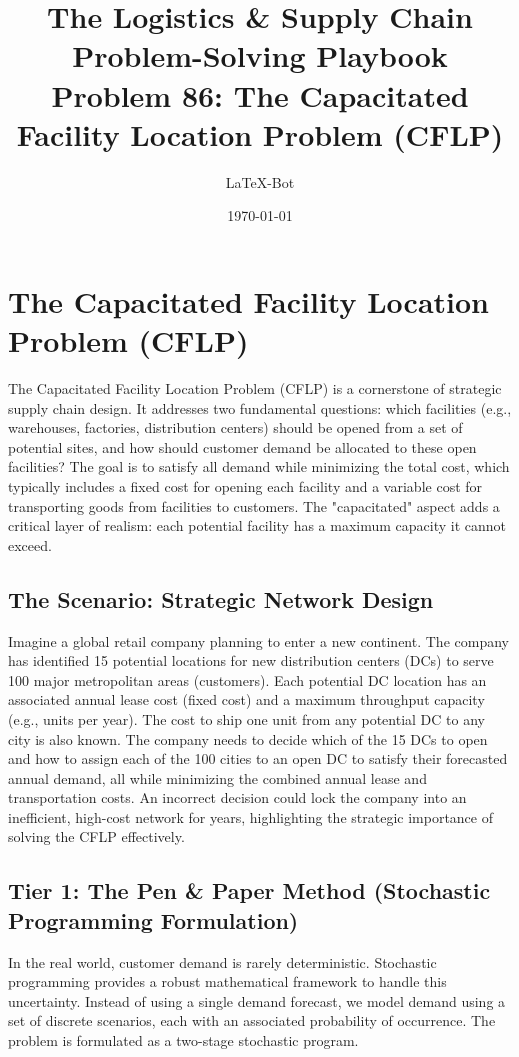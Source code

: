 \documentclass{article}
\title{The Logistics \& Supply Chain Problem-Solving Playbook\\
\Large Problem 86: The Capacitated Facility Location Problem (CFLP)}
\author{LaTeX-Bot}
\date{\today}
\begin{document}
\maketitle

\section{The Capacitated Facility Location Problem (CFLP)}
The Capacitated Facility Location Problem (CFLP) is a cornerstone of strategic supply chain design. It addresses two fundamental questions: which facilities (e.g., warehouses, factories, distribution centers) should be opened from a set of potential sites, and how should customer demand be allocated to these open facilities? The goal is to satisfy all demand while minimizing the total cost, which typically includes a fixed cost for opening each facility and a variable cost for transporting goods from facilities to customers. The "capacitated" aspect adds a critical layer of realism: each potential facility has a maximum capacity it cannot exceed.

\subsection{The Scenario: Strategic Network Design}
Imagine a global retail company planning to enter a new continent. The company has identified 15 potential locations for new distribution centers (DCs) to serve 100 major metropolitan areas (customers). Each potential DC location has an associated annual lease cost (fixed cost) and a maximum throughput capacity (e.g., units per year). The cost to ship one unit from any potential DC to any city is also known. The company needs to decide which of the 15 DCs to open and how to assign each of the 100 cities to an open DC to satisfy their forecasted annual demand, all while minimizing the combined annual lease and transportation costs. An incorrect decision could lock the company into an inefficient, high-cost network for years, highlighting the strategic importance of solving the CFLP effectively.

\subsection{Tier 1: The Pen \& Paper Method (Stochastic Programming Formulation)}
In the real world, customer demand is rarely deterministic. Stochastic programming provides a robust mathematical framework to handle this uncertainty. Instead of using a single demand forecast, we model demand using a set of discrete scenarios, each with an associated probability of occurrence. The problem is formulated as a two-stage stochastic program.
\end{document}
